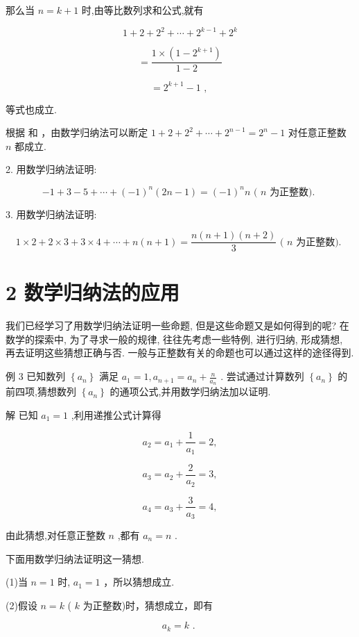 \documentclass[10pt]{article}
\newcommand*\circled[1]{\tikz[baseline=(char.base)]{\node[shape=circle,draw,inner sep=1.5pt] (char) {\small #1};}}
\begin{document}
那么当 \(n = k + 1\) 时,由等比数列求和公式,就有

\[
1 + 2 + {2}^{2} + \cdots  + {2}^{k - 1} + {2}^{k}
\]

\[
= \frac{1 \times  \left( {1 - {2}^{k + 1}}\right) }{1 - 2}
\]

\[
= {2}^{k + 1} - 1\text{ , }
\]

等式也成立.

根据 \circled{1} 和 \circled{2} ，由数学归纳法可以断定 \(1 + 2 + {2}^{2} + \cdots  + {2}^{n - 1} = {2}^{n} - 1\) 对任意正整数 \(n\) 都成立.

2. 用数学归纳法证明:

\[
- 1 + 3 - 5 + \cdots  + {\left( -1\right) }^{n}\left( {{2n} - 1}\right)  = {\left( -1\right) }^{n}n\text{ ( }n\text{ 为正整数). }
\]

3. 用数学归纳法证明:

\[
1 \times  2 + 2 \times  3 + 3 \times  4 + \cdots  + n\left( {n + 1}\right)  = \frac{n\left( {n + 1}\right) \left( {n + 2}\right) }{3}\text{ ( }n\text{ 为正整数). }
\]

\section*{2 数学归纳法的应用}

我们已经学习了用数学归纳法证明一些命题, 但是这些命题又是如何得到的呢? 在数学的探索中, 为了寻求一般的规律, 往往先考虑一些特例, 进行归纳, 形成猜想, 再去证明这些猜想正确与否. 一般与正整数有关的命题也可以通过这样的途径得到.

例 3 已知数列 \(\left\{  {a}_{n}\right\}\) 满足 \({a}_{1} = 1,{a}_{n + 1} = {a}_{n} + \frac{n}{{a}_{n}}\) . 尝试通过计算数列 \(\left\{  {a}_{n}\right\}\) 的前四项,猜想数列 \(\left\{  {a}_{n}\right\}\) 的通项公式,并用数学归纳法加以证明.

解 已知 \({a}_{1} = 1\) ,利用递推公式计算得

\[
{a}_{2} = {a}_{1} + \frac{1}{{a}_{1}} = 2,
\]

\[
{a}_{3} = {a}_{2} + \frac{2}{{a}_{2}} = 3,
\]

\[
{a}_{4} = {a}_{3} + \frac{3}{{a}_{3}} = 4,
\]

由此猜想,对任意正整数 \(n\) ,都有 \({a}_{n} = n\) .

下面用数学归纳法证明这一猜想.

(1)当 \(n = 1\) 时, \({a}_{1} = 1\) ，所以猜想成立.

(2)假设 \(n = k\) ( \(k\) 为正整数)时，猜想成立，即有

\[
{a}_{k} = k\text{ . }
\]
\end{document}
